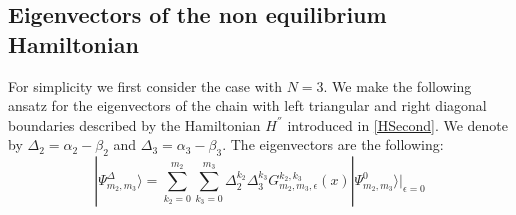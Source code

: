 \documentclass[11pt]{article}
\numberwithin{equation}{section}
\numberwithin{equation}{subsection}
\begin{document}
\subsection{Eigenvectors of the non equilibrium Hamiltonian}
For simplicity we first consider the case with $N=3$. We make the following ansatz for the eigenvectors of the chain with left triangular and right diagonal boundaries described by the Hamiltonian $H^{''}$ introduced in \eqref{HSecond}. We denote by $\Delta_{2}=\alpha_{2}-\beta_{2}$ and $\Delta_{3}=\alpha_{3}-\beta_{3}$. The eigenvectors are the following: 
\begin{equation}
	|\Psi_{m_{2},m_{3}}^{\Delta}\rangle=\sum_{k_{2}=0}^{m_{2}}\sum_{k_{3}=0}^{m_{3}}\Delta_{2}^{k_{2}}\Delta_{3}^{k_{3}}G_{m_{2},m_{3},\epsilon}^{k_{2},k_{3}}(x)|\Psi_{m_{2},m_{3}}^{0}\rangle|_{\epsilon=0}
\end{equation}
\end{document}
